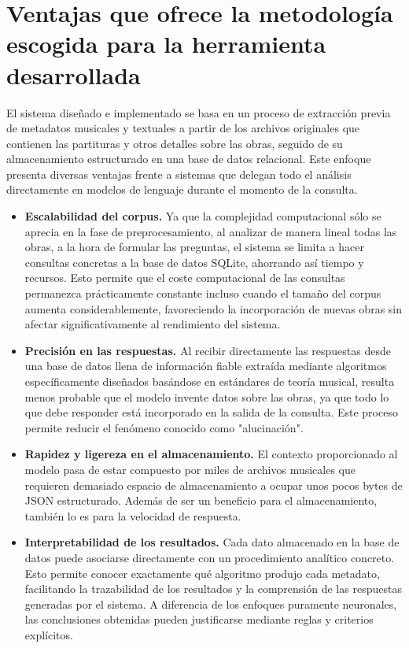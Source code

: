 \section{Ventajas que ofrece la metodología escogida para la herramienta desarrollada}
El sistema diseñado e implementado se basa en un proceso de extracción previa de metadatos musicales y textuales a partir de los archivos originales que contienen las partituras y otros detalles sobre las obras, seguido de su almacenamiento estructurado en una base de datos relacional. Este enfoque presenta diversas ventajas frente a sistemas que delegan todo el análisis directamente en modelos de lenguaje durante el momento de la consulta.
\begin{itemize}
\item \textbf{Escalabilidad del corpus.} Ya que la complejidad computacional sólo se aprecia en la fase de preprocesamiento, al analizar de manera lineal todas las obras, a la hora de formular las preguntas, el sistema se limita a hacer consultas concretas a la base de datos SQLite, ahorrando así tiempo y recursos. Esto permite que el coste computacional de las consultas permanezca prácticamente constante incluso cuando el tamaño del corpus aumenta considerablemente, favoreciendo la incorporación de nuevas obras sin afectar significativamente al rendimiento del sistema.
\item \textbf{Precisión en las respuestas.} Al recibir directamente las respuestas desde una base de datos llena de información fiable extraída mediante algoritmos específicamente diseñados basándose en estándares de teoría musical, resulta menos probable que el modelo invente datos sobre las obras, ya que todo lo que debe responder está incorporado en la salida de la consulta. Este proceso permite reducir el fenómeno conocido como "alucinación".
\item \textbf{Rapidez y ligereza en el almacenamiento.} El contexto proporcionado al modelo pasa de estar compuesto por miles de archivos musicales que requieren demasiado espacio de almacenamiento a ocupar unos pocos bytes de JSON estructurado. Además de ser un beneficio para el almacenamiento, también lo es para la velocidad de respuesta.
\item \textbf{Interpretabilidad de los resultados.} Cada dato almacenado en la base de datos puede asociarse directamente con un procedimiento analítico concreto. Esto permite conocer exactamente qué algoritmo produjo cada metadato, facilitando la trazabilidad de los resultados y la comprensión de las respuestas generadas por el sistema. A diferencia de los enfoques puramente neuronales, las conclusiones obtenidas pueden justificarse mediante reglas y criterios explícitos.

\end{itemize}
